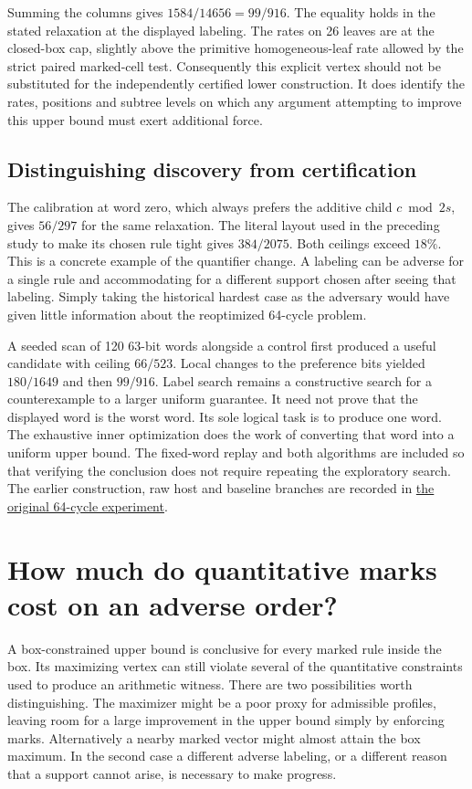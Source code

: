 \documentclass[12pt,letterpaper]{article}
\begin{document}
Summing the columns gives \(1584/14656=99/916\). The equality holds in the stated relaxation at the displayed labeling. The rates on 26 leaves are at the closed-box cap, slightly above the primitive homogeneous-leaf rate allowed by the strict paired marked-cell test. Consequently this explicit vertex should not be substituted for the independently certified lower construction. It does identify the rates, positions and subtree levels on which any argument attempting to improve this upper bound must exert additional force.

\subsection{Distinguishing discovery from certification}

The calibration at word zero, which always prefers the additive child \(c\bmod 2s\), gives \(56/297\) for the same relaxation. The literal layout used in the preceding study to make its chosen rule tight gives \(384/2075\). Both ceilings exceed \(18\%\). This is a concrete example of the quantifier change. A labeling can be adverse for a single rule and accommodating for a different support chosen after seeing that labeling. Simply taking the historical hardest case as the adversary would have given little information about the reoptimized 64-cycle problem.

A seeded scan of 120 63-bit words alongside a control first produced a useful candidate with ceiling \(66/523\). Local changes to the preference bits yielded \(180/1649\) and then \(99/916\). Label search remains a constructive search for a counterexample to a larger uniform guarantee. It need not prove that the displayed word is the worst word. Its sole logical task is to produce one word. The exhaustive inner optimization does the work of converting that word into a uniform upper bound. The fixed-word replay and both algorithms are included so that verifying the conclusion does not require repeating the exploratory search. The earlier construction, raw host and baseline branches are recorded in \href{https://github.com/nousentllc/riemann-hypothesis/pull/14}{the original 64-cycle experiment}.
\section{How much do quantitative marks cost on an adverse order?}
\label{sec:priced}
A box-constrained upper bound is conclusive for every marked rule inside the box. Its maximizing vertex can still violate several of the quantitative constraints used to produce an arithmetic witness. There are two possibilities worth distinguishing. The maximizer might be a poor proxy for admissible profiles, leaving room for a large improvement in the upper bound simply by enforcing marks. Alternatively a nearby marked vector might almost attain the box maximum. In the second case a different adverse labeling, or a different reason that a support cannot arise, is necessary to make progress.
\end{document}
